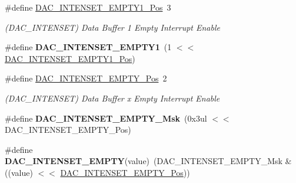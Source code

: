 \begin{DoxyCompactItemize}
\item 
\hypertarget{group___s_a_m_l21___d_a_c_ga3404b5813c75e2017e7b3de2aa672ac1}{}\#define \hyperlink{group___s_a_m_l21___d_a_c_ga3404b5813c75e2017e7b3de2aa672ac1}{D\+A\+C\+\_\+\+I\+N\+T\+E\+N\+S\+E\+T\+\_\+\+E\+M\+P\+T\+Y1\+\_\+\+Pos}~3\label{group___s_a_m_l21___d_a_c_ga3404b5813c75e2017e7b3de2aa672ac1}

\begin{DoxyCompactList}\small\item\em (D\+A\+C\+\_\+\+I\+N\+T\+E\+N\+S\+E\+T) Data Buffer 1 Empty Interrupt Enable \end{DoxyCompactList}\item 
\hypertarget{group___s_a_m_l21___d_a_c_gadd5526b8e72aa555e23fcd7983b8a90b}{}\#define {\bfseries D\+A\+C\+\_\+\+I\+N\+T\+E\+N\+S\+E\+T\+\_\+\+E\+M\+P\+T\+Y1}~(1 $<$$<$ \hyperlink{group___s_a_m_l21___d_a_c_ga3404b5813c75e2017e7b3de2aa672ac1}{D\+A\+C\+\_\+\+I\+N\+T\+E\+N\+S\+E\+T\+\_\+\+E\+M\+P\+T\+Y1\+\_\+\+Pos})\label{group___s_a_m_l21___d_a_c_gadd5526b8e72aa555e23fcd7983b8a90b}

\item 
\hypertarget{group___s_a_m_l21___d_a_c_ga12375d6d098ab02a3889530b60730fc4}{}\#define \hyperlink{group___s_a_m_l21___d_a_c_ga12375d6d098ab02a3889530b60730fc4}{D\+A\+C\+\_\+\+I\+N\+T\+E\+N\+S\+E\+T\+\_\+\+E\+M\+P\+T\+Y\+\_\+\+Pos}~2\label{group___s_a_m_l21___d_a_c_ga12375d6d098ab02a3889530b60730fc4}

\begin{DoxyCompactList}\small\item\em (D\+A\+C\+\_\+\+I\+N\+T\+E\+N\+S\+E\+T) Data Buffer x Empty Interrupt Enable \end{DoxyCompactList}\item 
\hypertarget{group___s_a_m_l21___d_a_c_gabdd31c6ff6ac6c1165d9727020b4720f}{}\#define {\bfseries D\+A\+C\+\_\+\+I\+N\+T\+E\+N\+S\+E\+T\+\_\+\+E\+M\+P\+T\+Y\+\_\+\+Msk}~(0x3ul $<$$<$ D\+A\+C\+\_\+\+I\+N\+T\+E\+N\+S\+E\+T\+\_\+\+E\+M\+P\+T\+Y\+\_\+\+Pos)\label{group___s_a_m_l21___d_a_c_gabdd31c6ff6ac6c1165d9727020b4720f}

\item 
\hypertarget{group___s_a_m_l21___d_a_c_ga72a5d71bf44ba73259156adbf9d4417e}{}\#define {\bfseries D\+A\+C\+\_\+\+I\+N\+T\+E\+N\+S\+E\+T\+\_\+\+E\+M\+P\+T\+Y}(value)~(D\+A\+C\+\_\+\+I\+N\+T\+E\+N\+S\+E\+T\+\_\+\+E\+M\+P\+T\+Y\+\_\+\+Msk \& ((value) $<$$<$ \hyperlink{group___s_a_m_l21___d_a_c_ga12375d6d098ab02a3889530b60730fc4}{D\+A\+C\+\_\+\+I\+N\+T\+E\+N\+S\+E\+T\+\_\+\+E\+M\+P\+T\+Y\+\_\+\+Pos}))\label{group___s_a_m_l21___d_a_c_ga72a5d71bf44ba73259156adbf9d4417e}


\end{DoxyCompactItemize}
